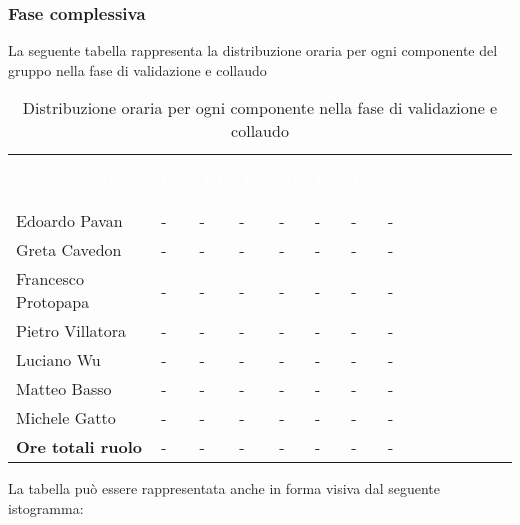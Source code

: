 \subsubsection{Fase complessiva}
La seguente tabella rappresenta la distribuzione oraria per ogni componente del gruppo nella fase di validazione e collaudo
\begin{table}[!htbp]
\begin{center}
\renewcommand{\arraystretch}{1.25}
\begin{tabular}{ m{}<{\centering}  m{}<{\centering} m{}<{\centering} m{}<{\centering}  m{}<{\centering}  m{}<{\centering}  m{}<{\centering}  m{}<{\centering}   }
	\rowcolor{darkblue}
	\textcolor{white}{\textbf{Componente}} &\textcolor{white}{\textbf{Re}}&\textcolor{white}{\textbf{Ad}}&\textcolor{white}{\textbf{An}}&\textcolor{white}{\textbf{Pt}}&\textcolor{white}{\textbf{Pr}}&\textcolor{white}{\textbf{Ve}}&\textcolor{white}{\textbf{Ore complessive}}\\ 

	Edoardo Pavan & - & - & - & - & - & - & -\\	

	Greta Cavedon & - & - & - & - & - & - & -\\
	
	Francesco Protopapa & - & - & - & - & - & - & -\\
	
	Pietro Villatora & - & - & - & - & - & - & -\\
	
	Luciano Wu & - & - & - & - & - & - & -\\
	
	Matteo Basso & - & - & - & - & - & - & -\\
	
	Michele Gatto & - & - & - & - & - & - & -\\
	
	\textbf{Ore totali ruolo} & - & - & - & - & - & - & -\\

\end{tabular}
\caption{Distribuzione oraria per ogni componente nella fase di validazione e collaudo}
\end{center}
\end{table}

La tabella può essere rappresentata anche in forma visiva dal seguente istogramma:

